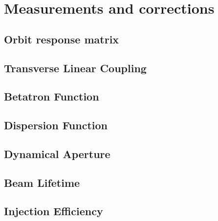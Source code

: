 \chapter{Measurements and corrections}

\section{Orbit response matrix}
\section{Transverse Linear Coupling}
\section{Betatron Function}
\section{Dispersion Function}
\section{Dynamical Aperture}
\section{Beam Lifetime}
\section{Injection Efficiency}
